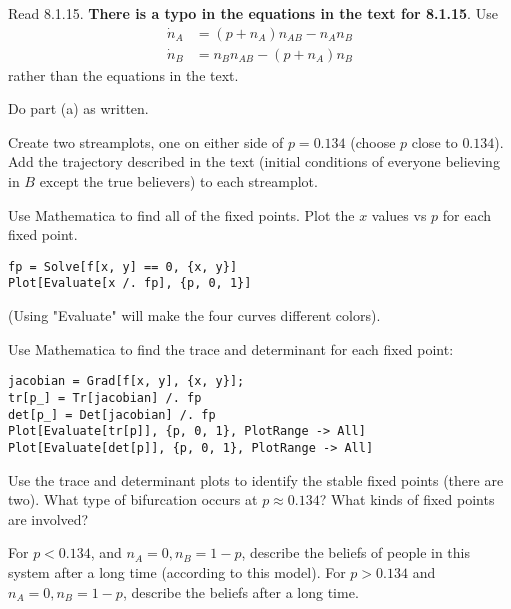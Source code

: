 \documentclass[12pt,letterpaper,noanswers]{exam}
\begin{document}
\begin{questions}
\question Read 8.1.15.  \textbf{There is a typo in the equations in the text for 8.1.15}.  Use
\begin{align*}
\dot n_A &= (p+n_A)n_{AB} - n_An_B \\
\dot n_B &= n_B n_{AB} -(p+n_A)n_B
\end{align*}
rather than the equations in the text.
\begin{parts}
\item Do part (a) as written.
\item Create two streamplots, one on either side of $p=0.134$ (choose $p$ close to $0.134$).  Add the trajectory described in the text (initial conditions of everyone believing in $B$ except the true believers) to each streamplot.
\item Use Mathematica to find all of the fixed points.  Plot the $x$ values vs $p$ for each fixed point.  
\begin{verbatim}
fp = Solve[f[x, y] == 0, {x, y}]
Plot[Evaluate[x /. fp], {p, 0, 1}]
\end{verbatim}
(Using "Evaluate" will make the four curves different colors).
\item Use Mathematica to find the trace and determinant for each fixed point:
\begin{verbatim}
jacobian = Grad[f[x, y], {x, y}];
tr[p_] = Tr[jacobian] /. fp
det[p_] = Det[jacobian] /. fp
Plot[Evaluate[tr[p]], {p, 0, 1}, PlotRange -> All]
Plot[Evaluate[det[p]], {p, 0, 1}, PlotRange -> All]
\end{verbatim}
\item Use the trace and determinant plots to identify the stable fixed points (there are two).  What type of bifurcation occurs at $p\approx 0.134$?  What kinds of fixed points are involved?
\item For $p<0.134$, and $n_A = 0, n_B = 1-p$, describe the beliefs of people in this system after a long time (according to this model). For $p>0.134$ and $n_A = 0, n_B = 1-p$, describe the beliefs after a long time.
\end{parts}

\end{questions}
\end{document}
